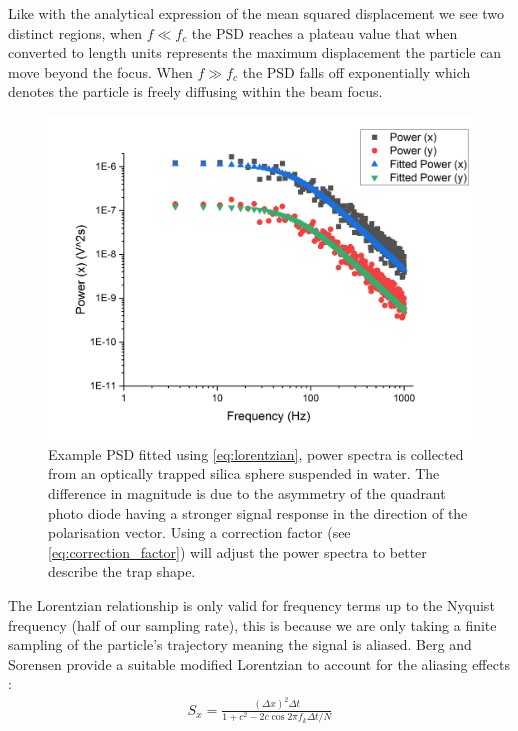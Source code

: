 Like with the analytical expression of the mean squared displacement we 
see two distinct regions, when $f\ll f_c$ the PSD reaches a plateau value 
that when converted to length units represents the maximum displacement 
the particle can move beyond the focus. When $f\gg f_c$ the PSD falls 
off exponentially which denotes the particle is freely diffusing within 
the beam focus.
\begin{figure}[h!]
	\centering
	\includegraphics[width=\linewidth]{PSD.png}
	\caption{Example PSD fitted using \eqref{eq:lorentzian}, power spectra is collected from an optically trapped silica sphere suspended in water. The difference in magnitude is due to the asymmetry of the quadrant photo diode having a stronger signal response in the direction of the polarisation vector. Using a correction factor (see \eqref{eq:correction_factor}) will adjust the power spectra to better describe the trap shape.}
\end{figure}

The Lorentzian relationship is only valid for frequency terms up to 
the Nyquist frequency (half of our sampling rate), this is because we 
are only taking a finite sampling of the particle's trajectory meaning 
the signal is aliased. Berg and Sorensen provide a suitable modified 
Lorentzian to account for the aliasing effects \cite{BergSoerensen2004}:
\begin{align}
	\label{eq:alaised_lorentzian}
	S_x = \frac{(\Delta x)^2\Delta t}{1+c^2-2c\cos{2\pi f_k\Delta t/N}}
\end{align}

